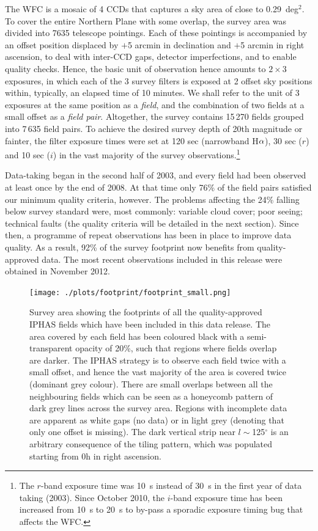 \documentclass[useAMS,usenatbib]{mn2e}
\def\ha{\mbox{H$\rm \alpha$}}
\def\deg{$^{\circ}$}
\begin{document}
The WFC is a mosaic of 4 CCDs 
that captures a sky area of close to 0.29~deg$^2$.
To cover the entire Northern Plane with some overlap,
the survey area was divided into 7635 telescope pointings.
Each of these pointings is accompanied by an offset position
displaced by $+$5 arcmin in declination 
and $+$5 arcmin in right ascension,
to deal with inter-CCD gaps, detector imperfections,
and to enable quality checks. 
Hence, the basic unit of observation hence
amounts to $2 \times 3$ exposures, 
in which each of the 3 survey filters is exposed at 2 offset sky positions 
within, typically, an elapsed time of 10 minutes.
We shall refer to the unit of 3 exposures at the same position 
as a \emph{field},
and the combination of two fields at a small offset as a \emph{field pair}.
Altogether, the survey contains 15\,270 fields grouped into 7\,635 field pairs.
To achieve the desired survey depth of 20th magnitude or fainter, 
the filter exposure times were set at 120 sec (narrowband \ha), 
30 sec ($r$) and 10 sec ($i$)
in the vast majority of the survey observations.\footnote{The $r$-band exposure time was 10~s instead of 30~s in the first year of data taking (2003). Since October 2010, the $i$-band exposure time 
has been increased from 10~s to 20~s to by-pass a sporadic exposure timing bug that affects the WFC.}

Data-taking began in the second half of 2003, 
and every field had been observed at least once by the end of 2008.
At that time only 76\% of the field pairs 
satisfied our minimum quality criteria, however.  The problems affecting
the 24\% falling below survey standard were, most commonly: variable cloud cover; 
poor seeing; technical faults (the quality criteria will be detailed in the 
next section). 
Since then, a programme of repeat observations has been in place 
to improve data quality. 
As a result, 92\% of the survey footprint
now benefits from quality-approved data.
The most recent observations included in this release
were obtained in November 2012.

\begin{figure}
        \texttt{[image: ./plots/footprint/footprint\_small.png]}
        \caption{Survey area showing the footprints
        of all the quality-approved IPHAS fields
        which have been included in this data release.
        The area covered by each field has been coloured black
        with a semi-transparent opacity of 20\%,
        such that regions where fields overlap are darker.
        The IPHAS strategy is to observe each field twice
        with a small offset,
        and hence the vast majority of the area 
        is covered twice (dominant grey colour).
        There are small overlaps between all the neighbouring fields
        which can be seen as a honeycomb pattern
        of dark grey lines across the survey area.
        Regions with incomplete data are apparent as white gaps (no data) 
        or in light grey (denoting that only one offset is missing).
        The dark vertical strip near $l \sim$125\deg
        is an arbitrary consequence of the tiling pattern,
        which was populated starting from 0h in right ascension.}
        \label{fig:footprint}
\end{figure}
\end{document}
